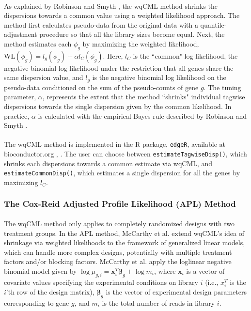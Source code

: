 \documentclass[10pt]{article}
\providecommand{\vc}[1]{\boldsymbol{#1}}
\begin{document}
\paragraph{} \indent As explained by Robinson and Smyth \cite{rs07}, the wqCML method shrinks the dispersions towards a common value using a weighted likelihood approach. The method first calculates pseudo-data from the original data with a quantile-adjustment procedure so that all the library sizes become equal. Next, the method estimates each $\phi_g$ by maximizing the weighted likelihood, $\text{WL}(\phi_g) = l_g(\phi_g) + \alpha l_C(\phi_g)$. Here, $l_C$ is the ``common" log likelihood, the negative binomial log likelihood under the restriction that all genes share the same dispersion value, and $l_g$ is the negative binomial log likelihood on the pseudo-data conditioned on the sum of the pseudo-counts of gene $g$. The tuning parameter, $\alpha$, represents the extent that the method ``shrinks" individual tagwise dispersions towards the single dispersion given by the common likelihood. In practice, $\alpha$ is calculated with the empirical Bayes rule described by Robinson and Smyth \cite{rs07}.

\paragraph{} \indent The wqCML method is implemented in the R package, {\tt edgeR}, available at {bioconductor.org} \cite{edger}, \cite{edger_m}. The user can choose between {\tt estimateTagwiseDisp()}, which shrinks each dispersions towards a common estimate via wqCML, and {\tt estimateCommonDisp()}, which estimates a single dispersion for all the genes by maximizing $l_C$.

\subsubsection*{The Cox-Reid Adjusted Profile Likelihood (APL) Method} \label{subsec:apl}

\paragraph{} \indent The wqCML method only applies to completely randomized designs with two treatment groups.
In the APL method, McCarthy et al. \cite{mcarthy} extend wqCML's idea of shrinkage via weighted likelihoods to the framework of generalized linear models, which can handle more complex designs, potentially with multiple treatment factors and/or blocking factors. McCarthy et al. \cite{mcarthy} apply the loglinear negative binomial model given by $\log \mu_{g, i} = \vc{x}_i^T \vc{\beta}_g + \log m_i$, where $\vc{x}_i$ is a vector of covariate values specifying the experimental conditions on library $i$ (i.e., $x_i^T$ is the $i$'th row of the design matrix), $\vc{\beta}_g$ is the vector of experimental design parameters corresponding to gene $g$, and $m_i$ is the total number of reads in library $i$.
\end{document}
